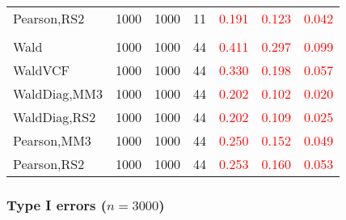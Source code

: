 \documentclass[
]{article}
\begin{document}
\begin{table}[H]
{\begin{tabular}[t]{lrrrrrr}
\hspace{1em}Pearson,RS2 & 1000 & 1000 & 11 & \textcolor{red}{0.191} & \textcolor{red}{0.123} & \textcolor{red}{0.042}\\
\addlinespace[0.3em]
\multicolumn{7}{l}{\textbf{3F 15V}}\\
\hspace{1em}Wald & 1000 & 1000 & 44 & \textcolor{red}{0.411} & \textcolor{red}{0.297} & \textcolor{red}{0.099}\\
\hspace{1em}WaldVCF & 1000 & 1000 & 44 & \textcolor{red}{0.330} & \textcolor{red}{0.198} & \textcolor{red}{0.057}\\
\hspace{1em}WaldDiag,MM3 & 1000 & 1000 & 44 & \textcolor{red}{0.202} & \textcolor{red}{0.102} & \textcolor{red}{0.020}\\
\hspace{1em}WaldDiag,RS2 & 1000 & 1000 & 44 & \textcolor{red}{0.202} & \textcolor{red}{0.109} & \textcolor{red}{0.025}\\
\hspace{1em}Pearson,MM3 & 1000 & 1000 & 44 & \textcolor{red}{0.250} & \textcolor{red}{0.152} & \textcolor{red}{0.049}\\
\hspace{1em}Pearson,RS2 & 1000 & 1000 & 44 & \textcolor{red}{0.253} & \textcolor{red}{0.160} & \textcolor{red}{0.053}\\
\bottomrule
\end{tabular}}
\endgroup{}
\end{table}

\hypertarget{type-i-errors-n3000-1}{%
\subsubsection{\texorpdfstring{Type I errors
(\(n=3000\))}{Type I errors (n=3000)}}\label{type-i-errors-n3000-1}}
\end{document}
